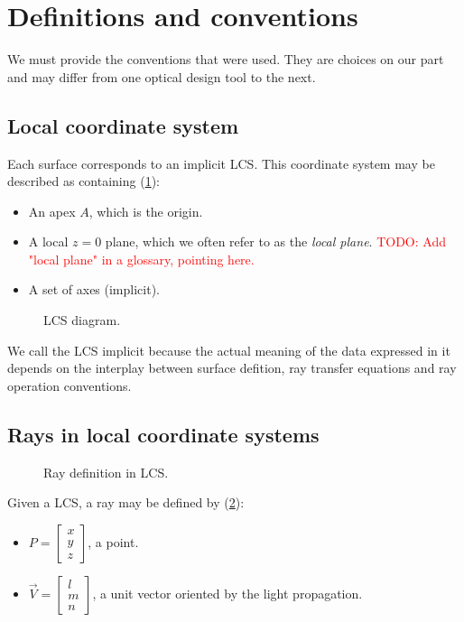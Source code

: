 \section{Definitions and conventions}
We must provide the conventions that were used. They are choices
on our part and may differ from one optical design tool to the next.

\subsection{Local coordinate system}
Each surface corresponds to an implicit \gls{LCS}.
This coordinate system may be described as containing (\cref{fig:LCS}):

\begin{itemize}
\item An apex $A$, which is the origin.
\item A local $z=0$ plane, which we often refer to as the \emph{local plane}.
      \textcolor{red}{TODO: Add "local plane" in a glossary, pointing here.}
\item A set of axes (implicit).
\end{itemize}

\begin{figure} \caption{\label{fig:LCS} LCS diagram.}

\end{figure}

We call the \gls{LCS} implicit because the actual meaning of the data
expressed in it depends on the interplay between surface defition, ray
transfer equations and ray operation conventions.

\subsection{Rays in local coordinate systems}

\begin{figure} \caption{\label{fig:ray-in-LCS} Ray definition
in \gls{LCS}.}

\end{figure}

Given a \gls{LCS}, a ray may be defined by (\cref{fig:ray-in-LCS}):
\begin{itemize}
\item $P = \begin{bmatrix}x \\ y \\ z \end{bmatrix}$, a point.
\item $\overrightarrow{V} = \begin{bmatrix} l \\ m \\ n \end{bmatrix}$, a unit
vector oriented by the light propagation.
\end{itemize}

